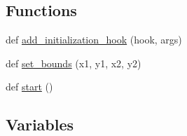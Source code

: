 \subsection*{Functions}
\begin{DoxyCompactItemize}
\item 
def \hyperlink{namespacevisualizer_1_1core_ab9e9ee9d3994751bcaa9153c7c6421d2}{add\+\_\+initialization\+\_\+hook} (hook, args)
\item 
def \hyperlink{namespacevisualizer_1_1core_a28f2b766b3f20c63aaf3857e61a26944}{set\+\_\+bounds} (x1, y1, x2, y2)
\item 
def \hyperlink{namespacevisualizer_1_1core_a2a35e5d8a34af358b508dac8635754e0}{start} ()
\end{DoxyCompactItemize}
\subsection*{Variables}
